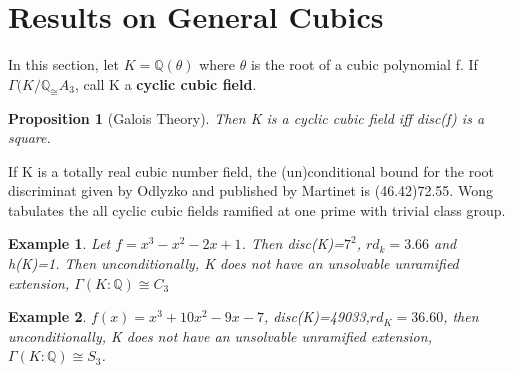 \documentclass[preprint,12pt,reqno]{elsarticle}
\newtheorem{proposition}{Proposition}
\newtheorem{example}{Example}
\begin{document}
\section{Results on General Cubics}
In this section, let $K=\mathbb{Q}(\theta)$ where $\theta$ is the root of a cubic polynomial 
f. If $\Gamma(K/\mathbb{Q}_\cong A_3$, call K a  \textbf{cyclic cubic field}.
\begin{proposition}[Galois Theory]
Then K is a cyclic cubic field iff disc(f) is a square. 
\end{proposition} If K is a totally real cubic number field, the (un)conditional bound for the root discriminat given by Odlyzko and published by Martinet is (46.42)72.55. Wong tabulates the all cyclic cubic fields ramified at one prime with trivial class group. 
\begin{example}
    Let $f=x^3-x^2-2x+1$. Then disc(K)=$7^2$, $rd_{k}=3.66$ and h(K)=1. Then unconditionally, K does not have an unsolvable unramified extension, $\Gamma(K:\mathbb{Q})\cong C_3$
\end{example}
\begin{example}
    $f(x)=x^3 + 10x^2 - 9x - 7$, disc(K)=49033,$rd_{K}=36.60$, then unconditionally, K does not have an unsolvable unramified extension, $\Gamma(K:\mathbb{Q})\cong S_3$.
\end{example}
\end{document}
